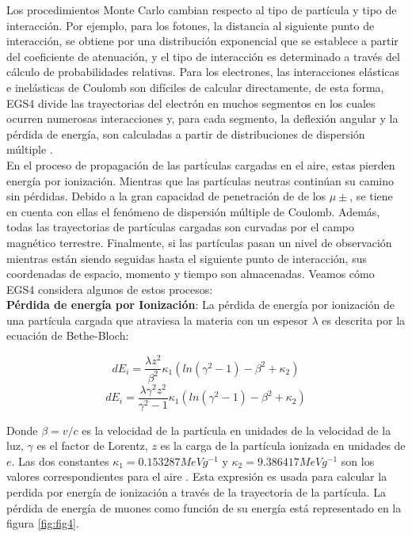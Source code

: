 Los procedimientos Monte Carlo cambian respecto al tipo de partícula y tipo de interacción. Por ejemplo, para los fotones, la distancia al siguiente punto de interacción, se obtiene por una distribución exponencial que se establece a partir del coeficiente de atenuación, y el tipo de interacción es determinado a través del cálculo de probabilidades relativas. Para los electrones, las interacciones elásticas e inelásticas de Coulomb son difíciles de calcular directamente, de esta forma, EGS4 divide las trayectorias del electrón en muchos segmentos en los cuales ocurren numerosas interacciones y, para cada segmento, la deflexión angular y la pérdida de energía, son calculadas a partir de distribuciones de dispersión múltiple \citep{EGS4book}.  \\

En el proceso de propagación de las partículas cargadas en el aire, estas pierden energía por ionización. Mientras que las partículas neutras continúan su camino sin pérdidas. Debido a la gran capacidad de penetración de de los $\mu\pm $, se tiene en cuenta con ellas el fenómeno de dispersión múltiple de Coulomb. Además, todas las trayectorias de partículas cargadas son curvadas por el campo magnético terrestre. Finalmente, si las partículas pasan un nivel de observación mientras están siendo seguidas  hasta el siguiente punto de interacción, sus coordenadas de espacio, momento y tiempo son almacenadas. Veamos cómo EGS4 considera algunos de estos procesos:\\

\textbf{Pérdida de energía por Ionización}: La pérdida de energía por ionización de una partícula cargada que atraviesa la materia con un espesor $\lambda$ es descrita por la ecuación de Bethe-Bloch:

\begin{equation*}
dE_{i} =  \frac{\lambda z^{2}}{\beta^{2}}\kappa_{1}(ln(\gamma^{2}-1)- \beta^{2}+\kappa_{2})
\end{equation*}
%
\begin{equation}
dE_{i} = \frac{\lambda \gamma^{2}z^{2}}{\gamma^{2}-1}\kappa_{1}(ln(\gamma^{2}-1)- \beta^{2}+\kappa_{2})
\label{eq:eq20}
\end{equation}

Donde $\beta = v/c $ es la velocidad de la partícula en unidades de la velocidad de la luz, $\gamma$ es el factor de Lorentz, $z$ es la carga de la partícula ionizada en unidades de $e$. Las dos constantes $\kappa_{1}= 0.153287 MeV g^{-1}$ y $\kappa_{2}= 9.386417 MeV g^{-1}$ son los valores correspondientes para el aire \citep{Heck1998}. Esta expresión es usada para calcular la perdida por energía de ionización a través de la trayectoria de la partícula. La pérdida de energía de muones como función de su energía está representado en la figura \ref{fig:fig4}.\\

